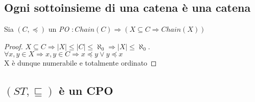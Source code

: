 \subsection{Ogni sottoinsieme di una catena è una catena}
\begin{esercizio}
  Sia $(C, \preceq)$ un \emph{PO} $: Chain(C) \Rightarrow (X \subseteq C \Rightarrow Chain(X))$
  \begin{proof}
    $X \subseteq C \Rightarrow |X| \leq |C| \leq \aleph_0 \Rightarrow |X| \leq \aleph_0$. $\forall x,y \in X \Rightarrow x,y \in C \Rightarrow x \preceq y \lor y \preceq x$\\
    X è dunque numerabile e totalmente ordinato
  \end{proof}
\end{esercizio}

\subsection{$(ST, \sqsubseteq)$ è un CPO}
